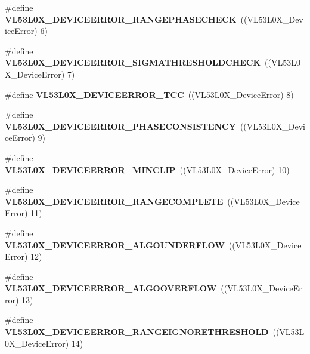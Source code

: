 \begin{DoxyCompactItemize}
\#define {\bfseries V\+L53\+L0\+X\+\_\+\+D\+E\+V\+I\+C\+E\+E\+R\+R\+O\+R\+\_\+\+R\+A\+N\+G\+E\+P\+H\+A\+S\+E\+C\+H\+E\+CK}~((V\+L53\+L0\+X\+\_\+\+Device\+Error) 6)
\item 
\mbox{\label{group__VL53L0X__DeviceError__group_ga8fc4ca53c3c74128f3bdb22627931d13}} 
\#define {\bfseries V\+L53\+L0\+X\+\_\+\+D\+E\+V\+I\+C\+E\+E\+R\+R\+O\+R\+\_\+\+S\+I\+G\+M\+A\+T\+H\+R\+E\+S\+H\+O\+L\+D\+C\+H\+E\+CK}~((V\+L53\+L0\+X\+\_\+\+Device\+Error) 7)
\item 
\mbox{\label{group__VL53L0X__DeviceError__group_ga2d2d4a90c3faeaeb70469ea94e9b31ab}} 
\#define {\bfseries V\+L53\+L0\+X\+\_\+\+D\+E\+V\+I\+C\+E\+E\+R\+R\+O\+R\+\_\+\+T\+CC}~((V\+L53\+L0\+X\+\_\+\+Device\+Error) 8)
\item 
\mbox{\label{group__VL53L0X__DeviceError__group_ga7029010c1a0a8be3aab1592db712d1ab}} 
\#define {\bfseries V\+L53\+L0\+X\+\_\+\+D\+E\+V\+I\+C\+E\+E\+R\+R\+O\+R\+\_\+\+P\+H\+A\+S\+E\+C\+O\+N\+S\+I\+S\+T\+E\+N\+CY}~((V\+L53\+L0\+X\+\_\+\+Device\+Error) 9)
\item 
\mbox{\label{group__VL53L0X__DeviceError__group_ga0785518b5293d64efc259aa54417b799}} 
\#define {\bfseries V\+L53\+L0\+X\+\_\+\+D\+E\+V\+I\+C\+E\+E\+R\+R\+O\+R\+\_\+\+M\+I\+N\+C\+L\+IP}~((V\+L53\+L0\+X\+\_\+\+Device\+Error) 10)
\item 
\mbox{\label{group__VL53L0X__DeviceError__group_ga1d304d396d8e3cc52b2f1c6cd5255391}} 
\#define {\bfseries V\+L53\+L0\+X\+\_\+\+D\+E\+V\+I\+C\+E\+E\+R\+R\+O\+R\+\_\+\+R\+A\+N\+G\+E\+C\+O\+M\+P\+L\+E\+TE}~((V\+L53\+L0\+X\+\_\+\+Device\+Error) 11)
\item 
\mbox{\label{group__VL53L0X__DeviceError__group_gaf62080499110dcfce5e394ccb3b7ccfc}} 
\#define {\bfseries V\+L53\+L0\+X\+\_\+\+D\+E\+V\+I\+C\+E\+E\+R\+R\+O\+R\+\_\+\+A\+L\+G\+O\+U\+N\+D\+E\+R\+F\+L\+OW}~((V\+L53\+L0\+X\+\_\+\+Device\+Error) 12)
\item 
\mbox{\label{group__VL53L0X__DeviceError__group_ga2fcd5c19bb4d81fa2d84396ab3a07f23}} 
\#define {\bfseries V\+L53\+L0\+X\+\_\+\+D\+E\+V\+I\+C\+E\+E\+R\+R\+O\+R\+\_\+\+A\+L\+G\+O\+O\+V\+E\+R\+F\+L\+OW}~((V\+L53\+L0\+X\+\_\+\+Device\+Error) 13)
\item 
\mbox{\label{group__VL53L0X__DeviceError__group_gabe98d58fc965f547d32579c333ed823c}} 
\#define {\bfseries V\+L53\+L0\+X\+\_\+\+D\+E\+V\+I\+C\+E\+E\+R\+R\+O\+R\+\_\+\+R\+A\+N\+G\+E\+I\+G\+N\+O\+R\+E\+T\+H\+R\+E\+S\+H\+O\+LD}~((V\+L53\+L0\+X\+\_\+\+Device\+Error) 14)
\end{DoxyCompactItemize}

